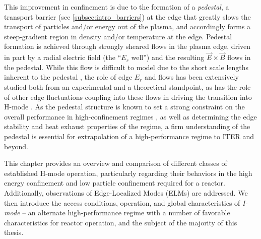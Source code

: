This improvement in confinement is due to the formation of a \emph{pedestal}, a transport barrier (see \cref{subsec:intro_barriers}) at the edge that greatly slows the transport of particles and/or energy out of the plasma, and accordingly forms a steep-gradient region in density and/or temperature at the edge.  Pedestal formation is achieved through strongly sheared flows in the plasma edge, driven in part by a radial electric field (the ``$E_r$ well'') and the resulting $\vec{E} \times \vec{B}$ flows in the pedestal.  While this flow is difficult to model due to the short scale lengths inherent to the pedestal \cite{Kagan2010,Landreman2012}, the role of edge $E_r$ and flows has been extensively studied both from an experimental \cite{Groebner1990,Burrell1999,Terry2000,McDermott2009a} and a theoretical \cite{Shaing1989,Biglari1990,Kim1991,Ware1996,Burrell1992} standpoint, as has the role of other edge fluctuations coupling into these flows in driving the transition into H-mode \cite{Schmitz2012}.  As the 
pedestal structure is known to set a strong constraint on the overall performance in high-confinement regimes \cite{Kinsey2011}, as well as determining the edge stability and heat exhaust properties of the regime, a firm understanding of the pedestal is essential for extrapolation of a high-performance regime to ITER and beyond.

This chapter provides an overview and comparison of different classes of established H-mode operation, particularly regarding their behaviors in the high energy confinement and low particle confinement required for a reactor.  Additionally, observations of Edge-Localized Modes (ELMs) \cite{Zohm1996} are addressed.  We then introduce the access conditions, operation, and global characteristics of \emph{I-mode} -- an alternate high-performance regime with a number of favorable characteristics for reactor operation, and the subject of the majority of this thesis.

